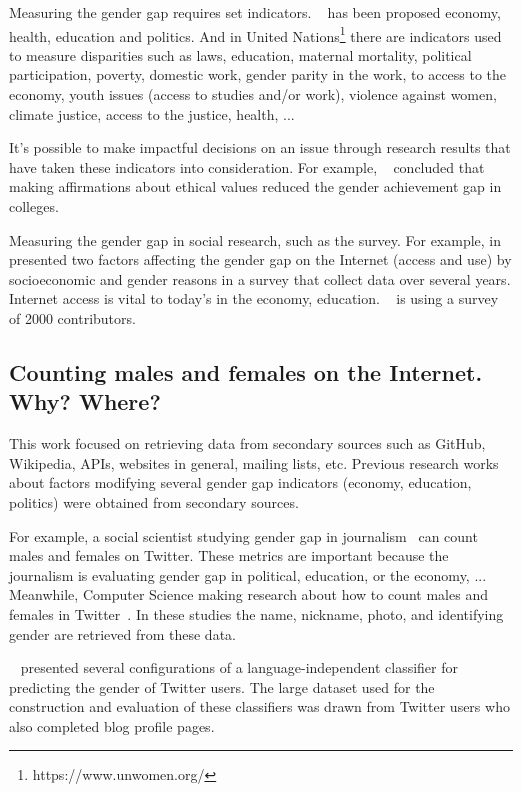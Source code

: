 \documentclass[a4paper]{article}
\begin{document}
Measuring the gender gap requires set indicators. ~\cite{world2021global}
has been proposed economy, health, education and politics. And in
United Nations\footnote{https://www.unwomen.org/} there are indicators
used to measure disparities such as laws, education, maternal mortality,
political participation, poverty, domestic work, gender parity in
the work, to access to the economy, youth issues (access to
studies and/or work), violence against women, climate justice,
access to the justice, health, ...

It's possible to make impactful decisions on an issue through research
results that have taken these indicators into consideration. For example,
~\cite{miyake2010reducing} concluded that making affirmations about
ethical values reduced the gender achievement gap in colleges.

Measuring the gender gap in social research, such as the survey. For
example, in ~\cite{bimber2000measuring} presented two factors affecting
the gender gap on the Internet (access and use) by socioeconomic and gender
reasons in a survey that collect data over several years. Internet
access is vital to today's in the economy, education.
~\cite{10.1007/978-3-319-39225-7_13} is using a survey of 2000
contributors.

\subsection{Counting males and females on the Internet. Why? Where?}

This work focused on retrieving data from secondary sources such as
GitHub, Wikipedia, APIs, websites in general, mailing lists, etc.
Previous research works about factors modifying several gender gap
indicators (economy, education, politics) were obtained from secondary
sources.

For example, a social scientist studying gender gap in
journalism~\cite{alvarez2012journalism} can count males and
females on Twitter. These metrics are important because the journalism
is evaluating gender gap in political, education, or the economy,
... Meanwhile, Computer Science making research about how to
count males and females in Twitter~\cite{burger2011discriminating}. In
these studies the name, nickname, photo, and identifying gender are
retrieved from these data.

~\cite{burger2011discriminating} presented several configurations of a
language-independent classifier for predicting the gender of Twitter
users. The large dataset used for the construction and evaluation of
these classifiers was drawn from Twitter users who also completed blog
profile pages.
\end{document}
